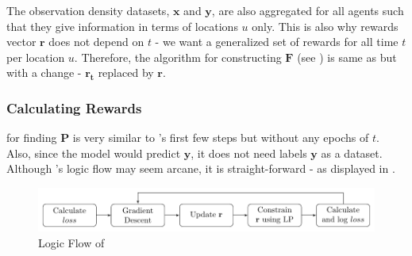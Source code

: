 \documentclass[12pt]{article}
\newcommand{\vect}[1]{\mathbf{#1}}  %
\newcommand{\matr}[1]{\mathbf{#1}}  %
\begin{document}
    The observation density datasets, $\matr{x}$ and $\matr{y}$, are also aggregated for all agents such that they give information in terms of locations $u$ only. This is also why rewards vector $\vect{r}$ does not depend on $t$ - we want a generalized set of rewards for all time $t$ per location $u$. Therefore, the algorithm for constructing $\matr{F}$ (see ) is same as  but with a change - $\vect{r_t}$ replaced by $\vect{r}$.
    
    \subsubsection{Calculating Rewards} \label{sec:Calculating Rewards}
     for finding $\matr{P}$ is very similar to 's first few steps but without any epochs of $t$. Also, since the model would predict $\vect{y}$, it does not need labels $\vect{y}$ as a dataset. Although 's logic flow may seem arcane, it is straight-forward - as displayed in .
    \begin{figure}[!htbp]
        \centering
        \includegraphics[width=\textwidth]{logic_alg_pricing}
        \caption{Logic Flow of }
        \label{fig:Logic Flow of Algorithm Pricing Problem}
    \end{figure}
\end{document}

